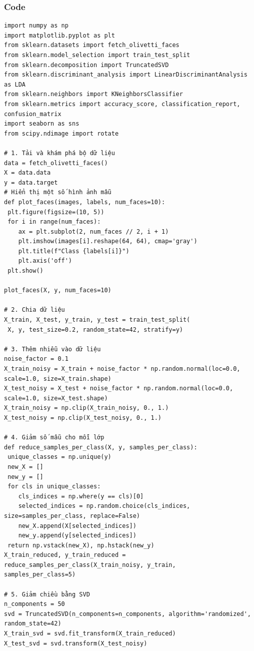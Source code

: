 \documentclass[a4paper,12pt]{extarticle}
\begin{document}
\subsubsection{Code}
\begin{verbatim}
import numpy as np
import matplotlib.pyplot as plt
from sklearn.datasets import fetch_olivetti_faces
from sklearn.model_selection import train_test_split
from sklearn.decomposition import TruncatedSVD
from sklearn.discriminant_analysis import LinearDiscriminantAnalysis as LDA 
from sklearn.neighbors import KNeighborsClassifier
from sklearn.metrics import accuracy_score, classification_report, confusion_matrix
import seaborn as sns
from scipy.ndimage import rotate

# 1. Tải và khám phá bộ dữ liệu
data = fetch_olivetti_faces()
X = data.data
y = data.target
# Hiển thị một số hình ảnh mẫu
def plot_faces(images, labels, num_faces=10):
 plt.figure(figsize=(10, 5))
 for i in range(num_faces):
    ax = plt.subplot(2, num_faces // 2, i + 1)
    plt.imshow(images[i].reshape(64, 64), cmap='gray')
    plt.title(f"Class {labels[i]}")
    plt.axis('off')
 plt.show()
 
plot_faces(X, y, num_faces=10)

# 2. Chia dữ liệu
X_train, X_test, y_train, y_test = train_test_split(
 X, y, test_size=0.2, random_state=42, stratify=y)
 
# 3. Thêm nhiễu vào dữ liệu
noise_factor = 0.1
X_train_noisy = X_train + noise_factor * np.random.normal(loc=0.0, scale=1.0, size=X_train.shape)
X_test_noisy = X_test + noise_factor * np.random.normal(loc=0.0, scale=1.0, size=X_test.shape)
X_train_noisy = np.clip(X_train_noisy, 0., 1.)
X_test_noisy = np.clip(X_test_noisy, 0., 1.)

# 4. Giảm số mẫu cho mỗi lớp
def reduce_samples_per_class(X, y, samples_per_class):
 unique_classes = np.unique(y)
 new_X = []
 new_y = []
 for cls in unique_classes:
    cls_indices = np.where(y == cls)[0]
    selected_indices = np.random.choice(cls_indices, size=samples_per_class, replace=False)
    new_X.append(X[selected_indices])
    new_y.append(y[selected_indices])
 return np.vstack(new_X), np.hstack(new_y)
X_train_reduced, y_train_reduced = reduce_samples_per_class(X_train_noisy, y_train,
samples_per_class=5)

# 5. Giảm chiều bằng SVD
n_components = 50
svd = TruncatedSVD(n_components=n_components, algorithm='randomized', random_state=42)
X_train_svd = svd.fit_transform(X_train_reduced)
X_test_svd = svd.transform(X_test_noisy)


\end{verbatim}
\end{document}
